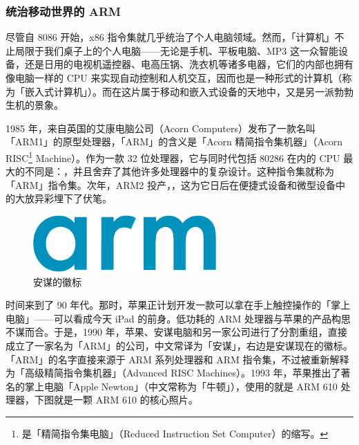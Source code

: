 \subsubsection{统治移动世界的 ARM}

尽管自 8086 开始，x86 指令集就几乎统治了个人电脑领域。然而，「计算机」不止局限于我们桌子上的个人电脑——无论是手机、平板电脑、MP3 这一众智能设备，还是日用的电视机遥控器、电高压锅、洗衣机等诸多电器，它们的内部也拥有像电脑一样的 CPU 来实现自动控制和人机交互，因而也是一种形式的计算机（称为「嵌入式计算机」）。而在这片属于移动和嵌入式设备的天地中，又是另一派勃勃生机的景象。

1985 年，来自英国的艾康电脑公司（Acorn Computers）发布了一款名叫「ARM1」的原型处理器，「ARM」的含义是「Acorn 精简指令集机器」（Acorn RISC\footnote{是「精简指令集电脑」（Reduced Instruction Set Computer）的缩写。} Machine）。作为一款 32 位处理器，它与同时代包括 80286 在内的 CPU 最大的不同是：，并且舍弃了其他许多处理器中的复杂设计。这种指令集就称为「ARM」指令集。次年，ARM2 投产，，这为它日后在便捷式设备和微型设备中的大放异彩埋下了伏笔。

\begin{figure}
  \centering
  \includegraphics[width=7cm]{assets/surpass/Arm_logo_2017.pdf}
  \caption{安谋的徽标}
  \label{fig:Arm_logo_2017}
\end{figure}

时间来到了 90 年代。那时，苹果正计划开发一款可以拿在手上触控操作的「掌上电脑」——可以看成今天 iPad 的前身。低功耗的 ARM 处理器与苹果的产品构思不谋而合。于是，1990 年，苹果、安谋电脑和另一家公司进行了分割重组，直接成立了一家名为「ARM」的公司，中文常译为「安谋」，右边是安谋现在的徽标。「ARM」的名字直接来源于 ARM 系列处理器和 ARM 指令集，不过被重新解释为「高级精简指令集机器」（Advanced RISC Machines）。1993 年，苹果推出了著名的掌上电脑「Apple Newton」（中文常称为「牛顿」），使用的就是 ARM 610 处理器，下图就是一颗 ARM 610 的核心照片。

